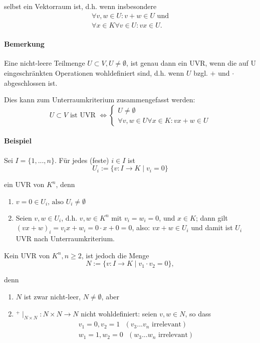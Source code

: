 	selbst ein Vektorraum ist, d.h. wenn insbesondere
	\begin{gather*}
		\forall v,w \in U: v+w\in U \text{ und}\\
		\forall x\in K\forall v\in U: vx\in U.
	\end{gather*}

\paragraph{Bemerkung}
	Eine nicht-leere Teilmenge $U\subset V, U\neq\emptyset$, ist genau dann ein UVR, wenn die auf U eingeschränkten Operationen wohldefiniert sind, d.h. wenn $ U $ bzgl. $ + $ und $ \cdot $ abgeschlossen ist.

	Dies kann zum Unterraumkriterium zusammengefasst werden:
	\begin{equation*}
		U\subset V \text{ ist UVR }\Leftrightarrow 
 		 \begin{cases}
 		 	U\neq\emptyset\\
 		 	\forall v,w\in U\forall x\in K: vx+w\in U
 		 \end{cases}
	\end{equation*}

\paragraph{Beispiel}
	Sei $I=\{1,...,n\}$. Für jedes (feste) $i\in I$ ist
	\begin{equation*}
		U_i := \{v:I\to K\mid v_i =0\}
	\end{equation*}

	ein UVR von $K^n$, denn
	\begin{enumerate}
		\item $v = 0 \in U_i\text{, also } U_i \neq \emptyset$
		\item Seien $v,w\in U_i$, d.h. $v,w\in K^n$ mit $v_i =w_i =0$, und $x\in K$; dann gilt $(vx+w)_i = v_ix+ w_i = 0\cdot x + 0 = 0$, also: $vx+w\in U_i$ und damit ist $U_i$ UVR nach Unterraumkriterium.  
	\end{enumerate}
	
	Kein UVR von $K^n, n\geq 2$, ist jedoch die Menge
	\begin{equation*}
		N:=\{v:I\to K\mid v_1\cdot v_2 = 0\},
	\end{equation*}
  
	denn 
	\begin{enumerate}
		\item $N$ ist zwar nicht-leer, $N\neq \emptyset$, aber
		\item $^+\mid_{N\times N}: N\times N\to N$ nicht wohldefiniert: seien $v,w\in N$, so dass
			\begin{gather*}
				v_1=0, v_2=1\text{ }(v_3 ... v_n \text{ irrelevant})\\
				w_1=1, w_2 = 0\text{ }(w_3 ... w_n \text{ irrelevant})
			\end{gather*}
	\end{enumerate}
	
